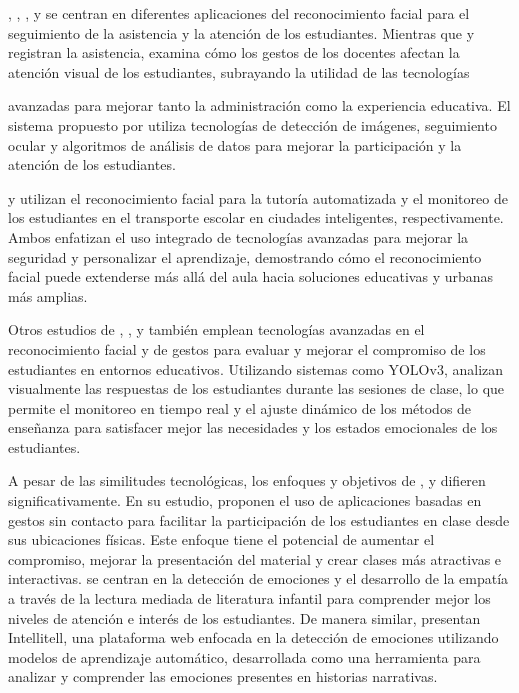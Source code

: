 \documentclass[a4paper,fleqn]{cas-sc}
\begin{document}
	\cite{Kulkarni2023}, \cite{Narkhede2023}, \cite{Farsani2020}, y \cite{Kumar2024Zoom} se centran en diferentes aplicaciones del reconocimiento facial para el seguimiento de la asistencia y la atención de los estudiantes. Mientras que \cite{Kulkarni2023} y \cite{Narkhede2023} registran la asistencia, \cite{Farsani2020} examina cómo los gestos de los docentes afectan la atención visual de los estudiantes, subrayando la utilidad de las tecnologías
	
	avanzadas para mejorar tanto la administración como la experiencia educativa. El sistema propuesto por \cite{Kumar2024Zoom} utiliza tecnologías de detección de imágenes, seguimiento ocular y algoritmos de análisis de datos para mejorar la participación y la atención de los estudiantes.
	
	\cite{Boumiza2017} y \cite{DaCosta2023} utilizan el reconocimiento facial para la tutoría automatizada y el monitoreo de los estudiantes en el transporte escolar en ciudades inteligentes, respectivamente. Ambos enfatizan el uso integrado de tecnologías avanzadas para mejorar la seguridad y personalizar el aprendizaje, demostrando cómo el reconocimiento facial puede extenderse más allá del aula hacia soluciones educativas y urbanas más amplias.
	
	Otros estudios de \cite{Riquelme2013}, \cite{Nguyen2019}, y \cite{Argel2023Intellitell} también emplean tecnologías avanzadas en el reconocimiento facial y de gestos para evaluar y mejorar el compromiso de los estudiantes en entornos educativos. Utilizando sistemas como YOLOv3, analizan visualmente las respuestas de los estudiantes durante las sesiones de clase, lo que permite el monitoreo en tiempo real y el ajuste dinámico de los métodos de enseñanza para satisfacer mejor las necesidades y los estados emocionales de los estudiantes.
	
	A pesar de las similitudes tecnológicas, los enfoques y objetivos de \cite{Erazo2016Easing}, \cite{Nguyen2019} y \cite{Riquelme2013} difieren significativamente. En su estudio, \cite{Erazo2016Easing} proponen el uso de aplicaciones basadas en gestos sin contacto para facilitar la participación de los estudiantes en clase desde sus ubicaciones físicas. Este enfoque tiene el potencial de aumentar el compromiso, mejorar la presentación del material y crear clases más atractivas e interactivas.
	\cite{Nguyen2019} se centran en la detección de emociones y el desarrollo de la empatía a través de la lectura mediada de literatura infantil para comprender mejor los niveles de atención e interés de los estudiantes. De manera similar, \cite{Argel2023Intellitell} presentan Intellitell, una plataforma web enfocada en la detección de emociones utilizando modelos de aprendizaje automático, desarrollada como una herramienta para analizar y comprender las emociones presentes en historias narrativas.
	
\end{document}
